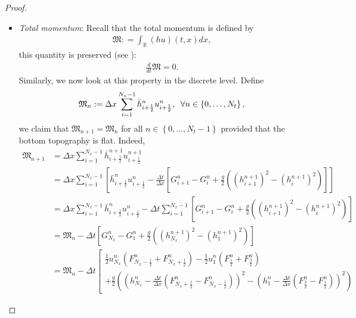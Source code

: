 \documentclass[11pt,a4paper,center,notitlepage]{article}
\numberwithin{equation}{section}
\begin{document}
\begin{proof}
\begin{itemize}
\item \textit{Total momentum}: Recall that the total momentum is defined by 
\begin{align*}
\mathfrak{M}: = \int_\mathbb{R} {\left( {hu} \right)\left( {t,x} \right)dx} ,
\end{align*}
this quantity is preserved (see \cite[Sec 3.1, p.21]{Duchene2019}): 
\begin{align}
\label{10}
\frac{d}{{dt}} \mathfrak{M} = 0.
\end{align}
Similarly, we now look at this property in the discrete level. Define 
\begin{align*}
{\mathfrak{M}_n}: = \Delta x\sum\limits_{i = 1}^{{N_x} - 1} {\bar h_{i + \frac{1}{2}}^nu_{i + \frac{1}{2}}^n} , \hspace{2mm} \forall n \in \left\{ {0, \ldots ,{N_t}} \right\},
\end{align*}
we claim that $\mathfrak{M}_{n+1} = \mathfrak{M}_n$ for all $n \in \left\{ {0, \ldots ,{N_t}-1} \right\}$ provided that the bottom topography is flat. Indeed,
\begin{align*}
{\mathfrak{M}_{n + 1}} &= \Delta x\sum\limits_{i = 1}^{{N_x} - 1} {\bar h_{i + \frac{1}{2}}^{n + 1}u_{i + \frac{1}{2}}^{n + 1}} \\
& = \Delta x\sum\limits_{i = 1}^{{N_x} - 1} {\left[ {\bar h_{i + \frac{1}{2}}^nu_{i + \frac{1}{2}}^n - \frac{{\Delta t}}{{\Delta x}}\left[ {G_{i + 1}^n - G_i^n + \frac{g}{2}\left( {{{\left( {h_{i + 1}^{n + 1}} \right)}^2} - {{\left( {h_i^{n + 1}} \right)}^2}} \right)} \right]} \right]} \\
 &= \Delta x\sum\limits_{i = 1}^{{N_x} - 1} {\bar h_{i + \frac{1}{2}}^nu_{i + \frac{1}{2}}^n}  - \Delta t\sum\limits_{i = 1}^{{N_x} - 1} {\left[ {G_{i + 1}^n - G_i^n + \frac{g}{2}\left( {{{\left( {h_{i + 1}^{n + 1}} \right)}^2} - {{\left( {h_i^{n + 1}} \right)}^2}} \right)} \right]} \\
&= {\mathfrak{M}_n} - \Delta t\left[ {G_{{N_x}}^n - G_1^n + \frac{g}{2}\left( {{{\left( {h_{{N_x}}^{n + 1}} \right)}^2} - {{\left( {h_1^{n + 1}} \right)}^2}} \right)} \right]\\
 &= {\mathfrak{M}_n} - \Delta t\left[ \begin{array}{l}
\frac{1}{2}u_{{N_x}}^n\left( {F_{{N_x} - \frac{1}{2}}^n + F_{{N_x} + \frac{1}{2}}^n} \right) - \frac{1}{2}u_1^n\left( {F_{\frac{1}{2}}^n + F_{\frac{3}{2}}^n} \right)\\
 + \frac{g}{2}\left( {{{\left( {h_{{N_x}}^n - \frac{{\Delta t}}{{\Delta x}}\left( {F_{{N_x} + \frac{1}{2}}^n - F_{{N_x} - \frac{1}{2}}^n} \right)} \right)}^2} - {{\left( {h_1^n - \frac{{\Delta t}}{{\Delta x}}\left( {F_{\frac{3}{2}}^n - F_{\frac{1}{2}}^n} \right)} \right)}^2}} \right)

\end{array}
\end{align*}
\end{itemize}
\end{proof}
\end{document}

